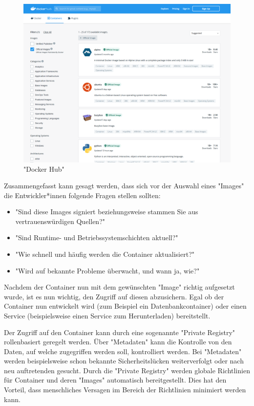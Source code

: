 \begin{figure}[H]
    \centering
    \includegraphics[width=\textwidth]{media/DockerAndContainering/DockerHub.png}
    \caption{"Docker Hub" \cite{DockerHub}}
    \label{fig:dockerhub}
\end{figure}

Zusammengefasst kann gesagt werden, dass sich vor der Auswahl eines "Images" die Entwickler*innen folgende Fragen stellen sollten:

\begin{itemize}
    \item "Sind diese Images signiert beziehungsweise stammen Sie aus vertrauenswürdigen Quellen?" \cite{ContainerSecurity}
    \item "Sind Runtime- und Betriebssystemschichten aktuell?" \cite{ContainerSecurity}
    \item "Wie schnell und häufig werden die Container aktualisiert?" \cite{ContainerSecurity}
    \item "Wird auf bekannte Probleme überwacht, und wann ja, wie?" \cite{ContainerSecurity}
\end{itemize}


Nachdem der Container nun mit dem gewünschten "Image" richtig aufgesetzt wurde, ist es nun wichtig, den Zugriff auf diesen abzusichern. Egal ob der Container nun entwickelt wird (zum Beispiel ein Datenbankcontainer) oder einen Service (beispielsweise einen Service zum Herunterladen) bereitstellt. 

Der Zugriff auf den Container kann durch eine sogenannte "Private Registry" rollenbasiert geregelt werden. Über "Metadaten" kann die Kontrolle von den Daten, auf welche zugegriffen werden soll, kontrolliert werden. Bei "Metadaten" werden beispielsweise schon bekannte Sicherheitslücken weiterverfolgt oder nach neu auftretenden gesucht. Durch die "Private Registry" werden globale Richtlinien für Container und deren "Images" automatisch bereitgestellt. Dies hat den Vorteil, dass menschliches Versagen im Bereich der Richtlinien minimiert werden kann. \cite{ContainerSecurity}

